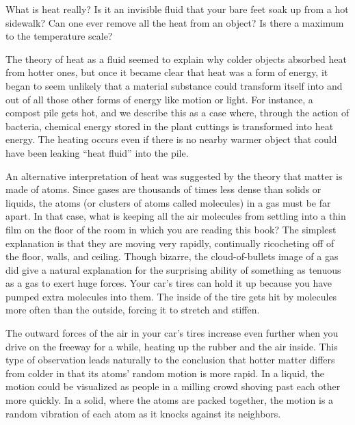 What is heat really?
Is it an invisible fluid that your bare feet soak up from a
hot sidewalk? Can one ever remove all the heat from an
object? Is there a maximum to the temperature scale?

The theory of heat as a fluid seemed
to explain why colder objects absorbed heat from hotter
ones, but once it became clear that heat was a form of
energy, it began to seem unlikely that a material substance
could transform itself into and out of all those other forms
of energy like motion or light. For instance, a compost pile
gets hot, and we describe this as a case where, through the
action of bacteria, chemical energy stored in the plant
cuttings is transformed into heat energy. The heating occurs
even if there is no nearby warmer object that could have
been leaking ``heat fluid'' into the pile.


An alternative interpretation of heat was suggested by the
theory that matter is made of atoms. Since gases are
thousands of times less dense than solids or liquids, the
atoms (or clusters of atoms called molecules) in a gas must
be far apart. In that case, what is keeping all the air
molecules from settling into a thin film on the floor of the
room in which you are reading this book? The simplest
explanation is that they are moving very rapidly, continually
ricocheting off of the floor, walls, and ceiling. Though
bizarre, the cloud-of-bullets image of a gas did give a
natural explanation for the surprising ability of something
as tenuous as a gas to exert huge forces. Your car's tires
can hold it up because you have pumped extra molecules into
them. The inside of the tire gets hit by molecules more
often than the outside, forcing it to stretch and stiffen.

The outward forces of the air in your car's tires increase
even further when you drive on the freeway for a while,
heating up the rubber and the air inside. This type of
observation leads naturally to the conclusion that hotter
matter differs from colder in that its atoms' random motion
is more rapid. In a liquid, the motion could be visualized
as people in a milling crowd shoving past each other more
quickly. In a solid, where the atoms are packed together,
the motion is a random vibration of each atom as it knocks
against its neighbors.


